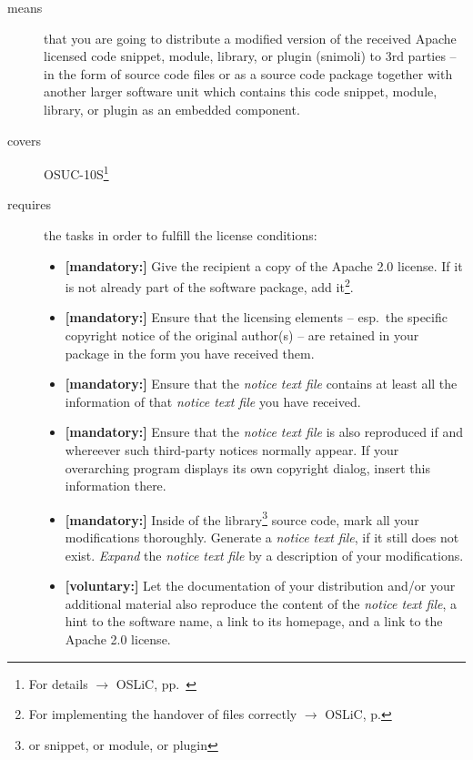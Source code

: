 \begin{description}
\item[means] that you are going to distribute a modified version of the received
Apache licensed code snippet, module, library, or plugin (snimoli) to 3rd
parties -- in the form of source code files or as a source code package together
with another larger software unit which contains this code snippet, module,
library, or plugin as an embedded component.
\item[covers] OSUC-10S\footnote{For details $\rightarrow$ OSLiC, pp.\
\pageref{OSUC-10S-DEF}}
\item[requires] the tasks in order to fulfill the license conditions:
\begin{itemize}
  
  \item \textbf{[mandatory:]} Give the recipient a copy of the Apache 2.0
  license. If it is not already part of the software package, add
  it\footnote{For implementing the handover of files correctly $\rightarrow$
  OSLiC, p. \pageref{DistributingFilesHint}}.

  \item \textbf{[mandatory:]} Ensure that the licensing elements -- esp.\ the
  specific copyright notice of the original author(s) -- are retained in your
  package in the form you have received them.
  
  \item \textbf{[mandatory:]} Ensure that the \emph{notice text file} contains at least
  all the information of that \emph{notice text file} you have received.
 
  \item \textbf{[mandatory:]} Ensure that the \emph{notice text file} is also
  reproduced if and whereever such third-party notices normally appear. If your
  overarching program displays its own copyright dialog, insert this information
  there.
 
  \item \textbf{[mandatory:]} Inside of the library\footnote{or snippet, or
  module, or plugin} source code, mark all your modifications thoroughly.
  Generate a \emph{notice text file}, if it still does not exist. \emph{Expand}
  the \emph{notice text file} by a description of your modifications.
  
  \item \textbf{[voluntary:]} Let the documentation of your distribution and/or
  your additional material also reproduce the content of the \emph{notice text
  file}, a hint to the software name, a link to its homepage, and a link to the
  Apache 2.0 license.


\end{itemize}
\end{description}
